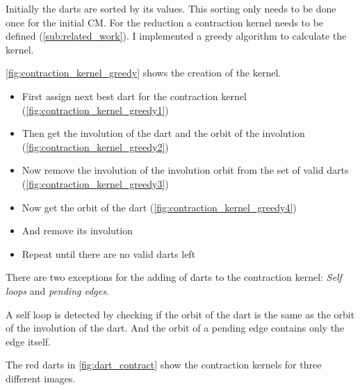 \documentclass[12pt]{article}
\begin{document}
Initially the darts are sorted by its values. This sorting only needs to be done once for the initial CM\@. For the reduction a contraction kernel needs to be defined (\cref{sub:related_work}). I implemented a greedy algorithm to calculate the kernel.
\par
\cref{fig:contraction_kernel_greedy} shows the creation of the kernel.
\begin{itemize}
  \item First assign next best dart for the contraction kernel (\cref{fig:contraction_kernel_greedy1})
  \item Then get the involution of the dart and the orbit of the involution (\cref{fig:contraction_kernel_greedy2})
  \item Now remove the involution of the involution orbit from the set of valid darts (\cref{fig:contraction_kernel_greedy3})
  \item Now get the orbit of the dart (\cref{fig:contraction_kernel_greedy4})
  \item And remove its involution
  \item Repeat until there are no valid darts left
\end{itemize}

There are two exceptions for the adding of darts to the contraction kernel:
\emph{Self loops} and \emph{pending edges}.
\par
A self loop is detected by checking if the orbit of the dart is the same as the orbit of the involution of the dart. And the orbit of a pending edge contains only the edge itself.

The red darts in \cref{fig:dart_contract} show the contraction kernels for three different images.
\end{document}
